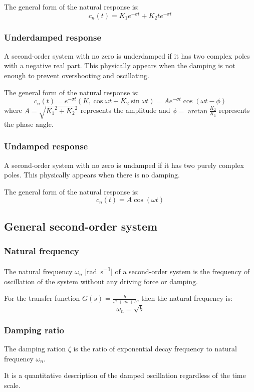 \documentclass[10pt, twocolumn]{article}
\begin{document}
The general form of the natural response is:
\[
  c_n(t) = K_1 e^{-\sigma t} + K_2 t e^{-\sigma t}
\]


\subsubsection{Underdamped response}
A second-order system with no zero is underdamped if it has two complex poles with a negative real part.
This physically appears when the damping is not enough to prevent overshooting and oscillating.

The general form of the natural response is:
\[
  c_n(t) = e^{-\sigma t} \left( K_1 \cos{\omega t}  + K_2 \sin{\omega t} \right) = A e^{-\sigma t} \cos(\omega t - \phi)
\]
where \(A = \sqrt{{K_1}^2 + {K_2}^2}\) represents the amplitude and \(\phi = \arctan\frac{K_2}{K_1}\) represents the phase angle.


\subsubsection{Undamped response}
A second-order system with no zero is undamped if it has two purely complex poles.
This physically appears when there is no damping.

The general form of the natural response is:
\[
  c_n(t) = A \cos(\omega t)
\]


\subsection{General second-order system}
\subsubsection{Natural frequency}
The natural frequency \(\omega_n\) [\si{\radian\per\second}] of a second-order system is the frequency of oscillation of the system without any driving force or damping.

For the transfer function \(G(s) = \frac{b}{s^2 + as + b}\), then the natural frequency is:
\[
  \omega_n = \sqrt{b}
\]


\subsubsection{Damping ratio}
The damping ration \(\zeta\) is the ratio of exponential decay frequency to natural frequency \(\omega_n\).

It is a quantitative description of the damped oscillation regardless of the time scale.
\end{document}
